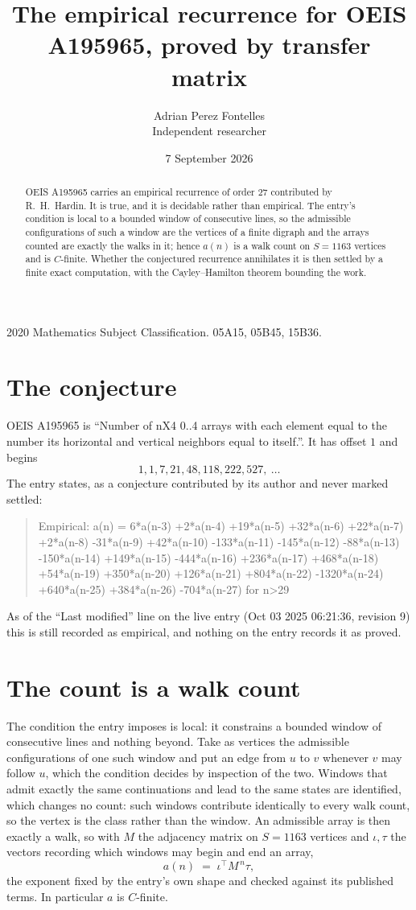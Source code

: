 \documentclass[11pt,a4paper]{article}
\title{The empirical recurrence for OEIS A195965, proved by transfer matrix}
\author{Adrian Perez Fontelles\\ \small Independent researcher}
\date{7 September 2026}
\theoremstyle{plain}
\theoremstyle{definition}
\begin{document}
\maketitle

\begin{abstract}
OEIS A195965 carries an empirical recurrence of order $27$ contributed by R.~H.~Hardin. It is
true, and it is decidable rather than empirical. The entry's condition is local to a bounded window of consecutive lines, so
the admissible configurations of such a window are the vertices of a finite digraph and the
arrays counted are exactly the walks in it; hence $a(n)$ is a walk count on $S=1163$ vertices
and is $C$-finite. Whether the conjectured recurrence annihilates it is then settled by a
finite exact computation, with the Cayley--Hamilton theorem bounding the work.
\end{abstract}

\noindent\small 2020 Mathematics Subject Classification. 05A15, 05B45, 15B36.\normalsize

\section{The conjecture}

OEIS A195965 is ``Number of nX4 0..4 arrays with each element equal to the number its horizontal and vertical neighbors equal to itself.''. It has offset $1$ and begins
\[
1, 1, 7, 21, 48, 118, 222, 527,\ \dots
\]
The entry states, as a conjecture contributed by its author and never marked settled:
\begin{quote}
Empirical: a(n) = 6*a(n-3) +2*a(n-4) +19*a(n-5) +32*a(n-6) +22*a(n-7) +2*a(n-8) -31*a(n-9) +42*a(n-10) -133*a(n-11) -145*a(n-12) -88*a(n-13) -150*a(n-14) +149*a(n-15) -444*a(n-16) +236*a(n-17) +468*a(n-18) +54*a(n-19) +350*a(n-20) +126*a(n-21) +804*a(n-22) -1320*a(n-24) +640*a(n-25) +384*a(n-26) -704*a(n-27) for n>29
\end{quote}
As of the ``Last modified'' line on the live entry (Oct 03 2025 06:21:36, revision 9) this is still
recorded as empirical, and nothing on the entry records it as proved.

\section{The count is a walk count}

The condition the entry imposes is local: it constrains a bounded window of consecutive lines and nothing beyond. Take as
vertices the admissible configurations of one such window and put an edge from $u$ to $v$
whenever $v$ may follow $u$, which the condition decides by inspection of the two. Windows that admit exactly the same continuations and lead to the same states are identified, which changes no count: such windows contribute identically to every walk count, so the vertex is the class rather than the window. An
admissible array is then exactly a walk, so with $M$ the adjacency matrix on $S=1163$ vertices
and $\iota,\tau$ the vectors recording which windows may begin and end an array,
\[
a(n)\;=\;\iota^{\!\top}M^{\,n}\tau ,
\]
the exponent fixed by the entry's own shape and checked against its published terms. In
particular $a$ is $C$-finite.
\end{document}
